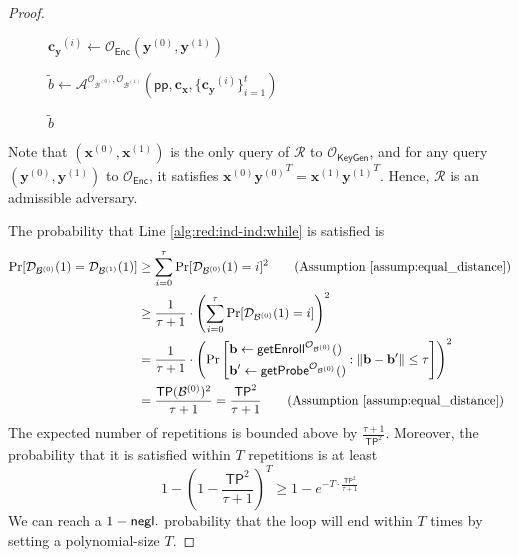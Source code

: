 \begin{proof}
\begin{figure}[h]
\begin{minipage}[t]{0.75\linewidth}
\begin{algorithm}[H]
\begin{algorithmic}[1]


			\State $\mathbf{c_y}^{(i)} \gets \mathcal{O}_{\textsf{Enc}}(\mathbf{y}^{(0)}, \mathbf{y}^{(1)})$ \label{alg:red:ind-ind:cy}

		\EndFor

		\State $\tilde{b} \gets {\mathcal{A}}^{\mathcal{O}_{\mathcal{B}^{(0)}}, \mathcal{O}_{\mathcal{B}^{(1)}} } (\textsf{pp}, \mathbf{c_x}, \{ \mathbf{c_y}^{(i)} \}_{i=1}^t )$ \label{alg:red:ind-ind:A}

		\State \Return $\tilde{b}$

	\end{algorithmic}
	\end{algorithm}
	\end{minipage}
	
\end{figure}

\noindent Note that $(\mathbf{x}^{(0)}, \mathbf{x}^{(1)})$ is the only query of $\mathcal{R}$ to $\mathcal{O}_{\textsf{KeyGen}}$, and for any query $( \mathbf{y}^{(0)}, {\mathbf{y}^{(1)}} )$ to $\mathcal{O}_{\textsf{Enc}}$, it satisfies $\mathbf{x}^{(0)}{\mathbf{y}^{(0)}}^T = \mathbf{x}^{(1)}{\mathbf{y}^{(1)}}^T$. Hence, $\mathcal{R}$ is an admissible adversary.

The probability that Line \ref{alg:red:ind-ind:while} is satisfied is
\begin{align*}
	\Pr[\mathcal{D}_{\mathcal{B}^{(0)}}(1) = \mathcal{D}_{\mathcal{B}^{(1)}}(1)] 
	&\geq \sum_{i=0}^\tau \Pr[\mathcal{D}_{\mathcal{B}^{(0)}}(1) = i]^2 \qquad \text{(Assumption \ref{assump:equal_distance})} \\
	&\geq \frac{1}{\tau + 1} \cdot \left( \sum_{i=0}^\tau \Pr[\mathcal{D}_{\mathcal{B}^{(0)}}(1) = i] \right)^2 \\
	&= \frac{1}{\tau + 1} \cdot \left( \Pr \left[
		\begin{aligned}
			& \mathbf{b} \gets \textsf{getEnroll}^{\mathcal{O}_{\mathcal{B}^{(0)}} }() \\
			& \mathbf{b}^\prime \gets \textsf{getProbe}^{\mathcal{O}_{\mathcal{B}^{(0)}} }()
		\end{aligned}
		: \| \mathbf{b} - \mathbf{b}^\prime \| \leq \tau \right] \right)^2 \\
	&= \frac{ \textsf{TP}(\mathcal{B}^{(0)})^2 }{\tau + 1} = \frac{ \textsf{TP}^2 }{\tau + 1} \qquad \text{(Assumption \ref{assump:equal_distance})} 
\end{align*}
The expected number of repetitions is bounded above by $\frac{\tau + 1}{ \textsf{TP}^2 }$. Moreover, the probability that it is satisfied within $T$ repetitions is at least
\[
	1 - (1 - \frac{ \textsf{TP}^2 }{\tau + 1})^T \geq 1 - e^{-T \cdot \frac{ \textsf{TP}^2 }{\tau + 1}}
\]
We can reach a $1 - \mathsf{negl}.$ probability that the loop will end within $T$ times by setting a polynomial-size $T$.


\end{proof}
